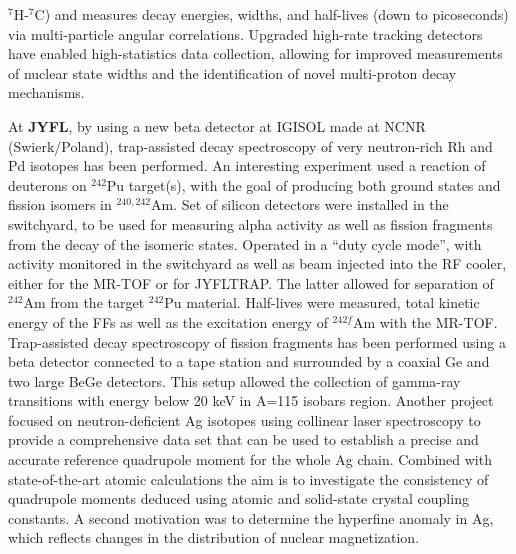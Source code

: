 $^7$H-$^7$C) and measures decay energies, widths, and half-lives (down to picoseconds) via multi-particle angular correlations. Upgraded high-rate tracking detectors have enabled high-statistics data collection, allowing for improved measurements of nuclear state widths and the identification of novel multi-proton decay mechanisms.

At \textbf{JYFL}, by using a new beta detector at IGISOL made at NCNR (Swierk/Poland), trap-assisted decay spectroscopy of very neutron-rich Rh and Pd isotopes has been performed. An interesting experiment used a reaction of deuterons on $^{242}$Pu target(s), with the goal of producing both ground states and fission isomers in $^{240,242}$Am. Set of silicon detectors were installed in the switchyard, to be used for measuring alpha activity as well as fission fragments from the decay of the isomeric states. Operated in a “duty cycle mode”, with activity monitored in the switchyard as well as beam injected into the RF cooler, either for the MR-TOF or for JYFLTRAP. The latter allowed for separation of $^{242}$Am from the target $^{242}$Pu material. Half-lives were measured, total kinetic energy of the FFs as well as the excitation energy of $^{242f}$Am with the MR-TOF. Trap-assisted decay spectroscopy of fission fragments has been performed using a beta detector connected to a tape station and surrounded by a coaxial Ge and two large BeGe detectors. This setup allowed the collection of gamma-ray transitions with energy below 20 keV in A=115 isobars region. Another project focused on neutron-deficient Ag isotopes using collinear laser spectroscopy to provide a comprehensive data set that can be used to establish a precise and accurate reference quadrupole moment for the whole Ag chain. Combined with state-of-the-art atomic calculations the aim is to investigate the consistency of quadrupole moments deduced using atomic and solid-state crystal coupling constants. A second motivation was to determine the hyperfine anomaly in Ag, which reflects changes in the distribution of nuclear magnetization. 

